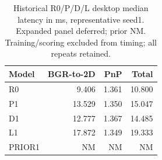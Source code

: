 \begin{table}[t]\centering\caption{Historical R0/P/D/L desktop median latency in ms, representative seed1. Expanded panel deferred; prior NM. Training/scoring excluded from timing; all repeats retained.}\label{tab:runtime}\small
\begin{tabular}{lrrr}\toprule Model & BGR-to-2D & PnP & Total\\\midrule
R0 & 9.406 & 1.361 & 10.800 \\
P1 & 13.529 & 1.350 & 15.047 \\
D1 & 12.777 & 1.367 & 14.485 \\
L1 & 17.872 & 1.349 & 19.333 \\
PRIOR1 & NM & NM & NM \\
\bottomrule\end{tabular}\end{table}

